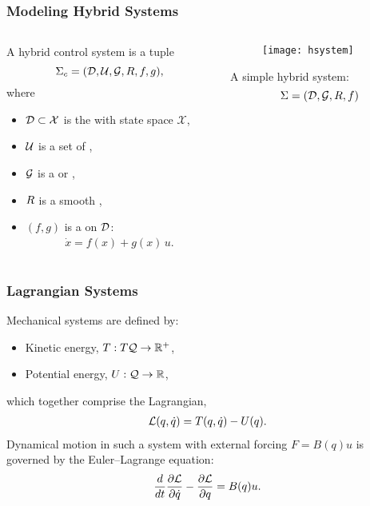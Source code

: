 \begin{frame}[t]
  \frametitle{Modeling Hybrid Systems}
  \begin{columns}
    \begin{column}{.63\textwidth}
      \begin{definition}
        A \alert{hybrid control system} is a tuple \vspace{-.3cm}
        $$\HCS = \hcsystem, \vspace{-.4cm}$$
        where
        \begin{itemize}
        \item
          $\mathcal{D} \subset \mathcal{X}$ is the  with state space $\mathcal{X}$,
        \item
          $\mathcal{U}$ is a set of ,
        \item
          $\mathcal{G}$ is a  or ,
        \item
          $R$ is a smooth ,
        \item
          $(f, g)$ is a  on $\mathcal{D}$: \vspace{-3mm}
          \begin{align*}
            \dot{x} = f(x) + g(x) \, u.
          \end{align*}
        \end{itemize}
      \end{definition}
    \end{column}
    \begin{column}{.4\textwidth}
      \begin{figure}
        \centering
        \texttt{[image: hsystem]}\\
      \end{figure}
      A \alert{simple hybrid system}:\vspace{-.3cm}
      $$\Sigma = (\mathcal{D}, \mathcal{G}, R, f)$$
    \end{column}
  \end{columns}
\end{frame}

\begin{frame}[t]
  \frametitle{Lagrangian Systems}
  Mechanical systems are defined by:
  \begin{itemize}
  \item Kinetic energy, $T : T\mathcal{Q} \to \mathbb{R}^+$,\\
  \item Potential energy, $U : \mathcal{Q} \to \mathbb{R}$,
  \end{itemize}
  which together comprise the Lagrangian,
  \begin{align*}
    \mathcal{L}(q, \dot q) = T(q, \dot q) - U(q).
  \end{align*}
  Dynamical motion in such a system with external forcing $F = B(q) u$ is governed by the Euler--Lagrange equation:
  \begin{align*}
    \frac{d}{dt} \frac{\partial{\ensuremath{\mathcal{L}}}}{\partial{\ensuremath{\dot q}}} - \frac{\partial{\ensuremath{\mathcal{L}}}}{\partial{\ensuremath{q}}} = B(q) u.
  \end{align*}
\end{frame}

